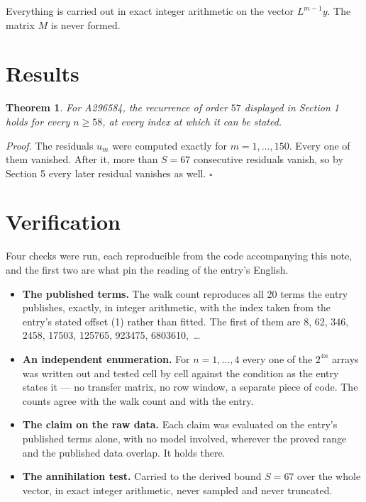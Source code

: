 \documentclass[11pt]{article}
\newtheorem{theorem}{Theorem}
\theoremstyle{definition}
\begin{document}
Everything is carried out in exact integer arithmetic on the vector $L^{m-1}y$. The matrix $M$ is never formed.

\section{Results}

\begin{theorem} For A296584, the recurrence of order $57$ displayed in Section 1 holds for every $n \ge 58$, at every index at which it can be stated.\end{theorem}

{\itshape Proof.} The residuals $u_m$ were computed exactly for $m = 1,\dots,150$. Every one of them vanished. After it, more than $S = 67$ consecutive residuals vanish, so by Section 5 every later residual vanishes as well. $\square$

\section{Verification}

Four checks were run, each reproducible from the code accompanying this note, and the first two are what pin the reading of the entry's English.

\begin{itemize}

\item {\bfseries The published terms.} The walk count reproduces all 20 terms the entry publishes, exactly, in integer arithmetic, with the index taken from the entry's stated offset (1) rather than fitted. The first of them are 8, 62, 346, 2458, 17503, 125765, 923475, 6803610,~\dots

\item {\bfseries An independent enumeration.} For $n = 1,\dots,4$ every one of the $2^{4n}$ arrays was written out and tested cell by cell against the condition as the entry states it --- no transfer matrix, no row window, a separate piece of code. The counts agree with the walk count and with the entry.

\item {\bfseries The claim on the raw data.} Each claim was evaluated on the entry's published terms alone, with no model involved, wherever the proved range and the published data overlap. It holds there.

\item {\bfseries The annihilation test.} Carried to the derived bound $S = 67$ over the whole vector, in exact integer arithmetic, never sampled and never truncated.

\end{itemize}
\end{document}
